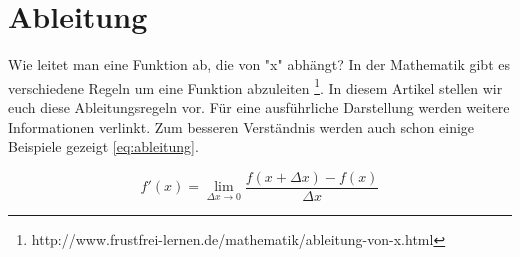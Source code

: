 \section{Ableitung}
\label{sec:ableitung}

Wie leitet man eine Funktion ab, die von "x" abhängt? In der Mathematik gibt es verschiedene Regeln um eine Funktion abzuleiten \footnote[2]{http://www.frustfrei-lernen.de/mathematik/ableitung-von-x.html}. In diesem Artikel stellen wir euch diese Ableitungsregeln vor. Für eine ausführliche Darstellung werden weitere Informationen verlinkt. Zum besseren Verständnis werden auch schon einige Beispiele gezeigt \ref{eq:ableitung}.

\label{eq:ableitung}
\[ f\prime(x) = \lim_{\Delta x \to 0} 
\frac{f(x+\Delta x)-f(x)}{\Delta x} \]


